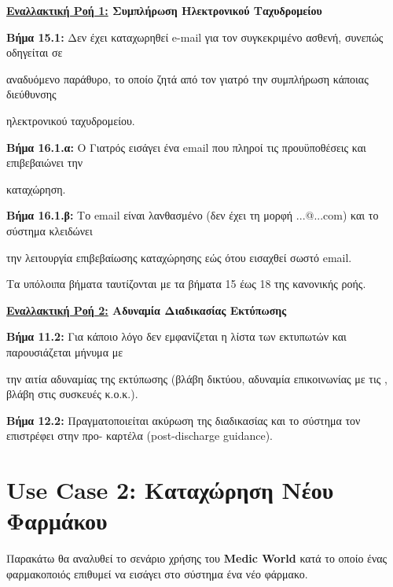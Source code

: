 \documentclass{article}
\begin{document}
  \textbf{\underline{Εναλλακτική Ροή 1:} Συμπλήρωση Ηλεκτρονικού Ταχυδρομείου} \vspace{0.2cm}
\par \textbf{Βήμα 15.1:} Δεν έχει καταχωρηθεί e-mail για τον συγκεκριμένο ασθενή, συνεπώς οδηγείται σε \par αναδυόμενο παράθυρο, το οποίο ζητά από τον γιατρό την συμπλήρωση κάποιας διεύθυνσης \par ηλεκτρονικού ταχυδρομείου.

\vspace{0.2cm}

\par \textbf{Βήμα 16.1.α:} Ο Γιατρός εισάγει ένα email που πληροί τις προυϋποθέσεις και επιβεβαιώνει την \par καταχώρηση. \vspace{0.2cm}
\par \textbf{Βήμα 16.1.β:} Το email είναι λανθασμένο (δεν έχει τη μορφή ...@...com) και το σύστημα κλειδώνει \par την λειτουργία επιβεβαίωσης καταχώρησης εώς ότου εισαχθεί σωστό email. \vspace{0.1cm}

\par Τα υπόλοιπα βήματα ταυτίζονται με τα βήματα 15 έως 18 της κανονικής ροής.

\vspace{0.2cm}

 \textbf{\underline{Εναλλακτική Ροή 2:} Αδυναμία Διαδικασίας Εκτύπωσης} \vspace{0.2cm}
\par \textbf{Βήμα 11.2:} Για κάποιο λόγο δεν εμφανίζεται η λίστα των εκτυπωτών και παρουσιάζεται μήνυμα με \par την αιτία αδυναμίας της εκτύπωσης (βλάβη δικτύου, αδυναμία επικοινωνίας με τις , βλάβη στις συσκευές κ.ο.κ.).\vspace{0.1cm}
\par \textbf{Βήμα 12.2:} Πραγματοποιείται ακύρωση της διαδικασίας και το σύστημα τον επιστρέφει στην προ-  καρτέλα (post-discharge guidance).

\newpage

\section{Use Case 2: Καταχώρηση Νέου Φαρμάκου }
 
 Παρακάτω θα αναλυθεί το σενάριο χρήσης του \textbf{Medic World} κατά το οποίο ένας φαρμακοποιός επιθυμεί να εισάγει στο σύστημα ένα νέο φάρμακο.
 
\end{document}
